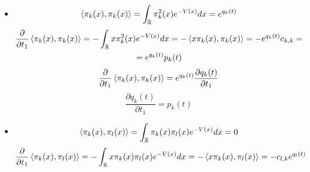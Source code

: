 \documentclass[12pt]{article}
\theoremstyle{definition}
\begin{document}
\begin{enumerate}
\begin{itemize}
        \item
        \begin{equation}
            \braket{\pi_k(x),\pi_k(x)}=\int_{\mathbb{R}}\pi^2_k(x)e^{-V(x)}dx=e^{q_k(t)}
        \end{equation}
        \begin{multline}
            \frac{\partial}{\partial t_1}\braket{\pi_k(x),\pi_k(x)}=-\int_{\mathbb{R}}x\pi^2_k(x)e^{-V(x)}dx=-\braket{x\pi_k(x),\pi_k(x)}=-e^{q_k(t)}c_{k,k}=\\=e^{q_k(t)}p_k(t)
        \end{multline}
        \begin{equation}
            \frac{\partial}{\partial t_1}\braket{\pi_k(x),\pi_k(x)}=e^{q_k(t)}\frac{\partial q_k(t)}{\partial t_1}
        \end{equation}
        \begin{equation}
            \boxed{\frac{\partial q_k(t)}{\partial t_1}=p_k(t)}
        \end{equation}
        \item 
        \begin{equation}
            \braket{\pi_k(x),\pi_l(x)}=\int_{\mathbb{R}}\pi_k(x)\pi_l(x)e^{-V(x)}dx=0
        \end{equation}
        \begin{multline}
            \frac{\partial}{\partial t_1}\braket{\pi_k(x),\pi_l(x)}=-\int_{\mathbb{R}}x\pi_k(x)\pi_l(x)e^{-V(x)}dx=-\braket{x\pi_k(x),\pi_l(x)}=-c_{l,k}e^{q_l(t)}
        \end{multline}
    \end{itemize}
\end{enumerate}
\end{document}
